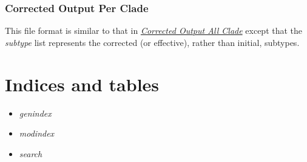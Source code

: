 \documentclass[letterpaper,10pt,english]{sphinxmanual}
\begin{document}
\subsection{Corrected Output Per Clade}
\label{defs:correctedperclade}\label{defs:corrected-output-per-clade}
This file format is similar to that in {\hyperref[defs:correctedall]{\emph{Corrected Output All Clade}}} except that the \emph{subtype} list represents the corrected (or effective), rather than initial, subtypes.


\chapter{Indices and tables}
\label{index:indices-and-tables}\begin{itemize}
\item {} 
\emph{genindex}

\item {} 
\emph{modindex}

\item {} 
\emph{search}

\end{itemize}



\renewcommand{\indexname}{Index}
\printindex
\end{document}

